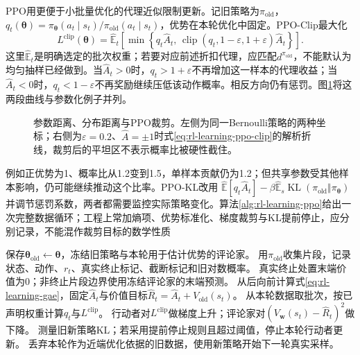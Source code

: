 PPO用更便于小批量优化的代理近似限制更新。记旧策略为$\pi_{\mathrm{old}}$，
$q_t(\bm\theta)=\pi_{\bm\theta}(a_t\mid s_t)/
\pi_{\mathrm{old}}(a_t\mid s_t)$，优势在本轮优化中固定。PPO-Clip最大化
\begin{equation}
  L^{\mathrm{clip}}(\bm\theta)=
    \widehat{\mathbb E}_t
      \left[\min\left\{q_t\widehat A_t,\,
        \operatorname{clip}(q_t,1-\varepsilon,1+\varepsilon)
                      \widehat A_t\right\}\right].
  \label{eq:rl-learning-ppo-clip}
\end{equation}
这里$\widehat{\mathbb E}_t$是明确选定的批次权重；若要对应前述折扣代理，应匹配$d^{\pi_{\mathrm{old}}}$，不能默认为均匀抽样已经做到。当$\widehat A_t>0$时，$q_t>1+\varepsilon$不再增加这一样本的代理收益；当$\widehat A_t<0$时，$q_t<1-\varepsilon$不再奖励继续压低该动作概率。相反方向仍有惩罚。图\ref{fig:rl-learning-policy-geometry}将这两段曲线与参数化例子并列。

\begin{figure}[t]
  \centering
  
  \caption{参数距离、分布距离与PPO裁剪。左侧为同一Bernoulli策略的两种坐标；右侧为$\varepsilon=0.2$、$\widehat A=\pm1$时式\eqref{eq:rl-learning-ppo-clip}的解析折线，裁剪后的平坦区不表示概率比被硬性截住。}
  \label{fig:rl-learning-policy-geometry}
\end{figure}

例如正优势为1、概率比从1.2变到1.5，单样本贡献仍为1.2；但共享参数受其他样本影响，仍可能继续推动这个比率。PPO-KL改用
$\widehat{\mathbb E}[q_t\widehat A_t]
-\beta\widehat{\mathbb E}_s\operatorname{KL}
(\pi_{\mathrm{old}}\Vert\pi_{\bm\theta})$
并调节惩罚系数，两者都需要监控实际策略变化。算法\ref{alg:rl-learning-ppo}给出一次完整数据循环；工程上常加熵项、优势标准化、梯度裁剪与KL提前停止，应分别记录，不能混作裁剪目标的数学性质

\begin{algorithm}
  \label{alg:rl-learning-ppo}
  \begin{algorithmic}[1]
    \State 保存$\bm\theta_{\mathrm{old}}\gets\bm\theta$，冻结旧策略与本轮用于估计优势的评论家。
    \State 用$\pi_{\mathrm{old}}$收集片段，记录状态、动作、$r_t$、真实终止标记、截断标记和旧对数概率。
    \State 真实终止处置末端价值为0；非终止片段边界使用冻结评论家的末端预测。
    \State 从后向前计算式\eqref{eq:rl-learning-gae}，固定$\widehat A_t$与价值目标$\widehat R_t=\widehat A_t+V_{\mathrm{old}}(s_t)$。
      \State 从本轮数据取批次，按已声明权重计算$q_t$与$L^{\mathrm{clip}}$。
      \State 行动者对$L^{\mathrm{clip}}$做梯度上升；评论家对$(V_{\bm w}(s_t)-\widehat R_t)^2$做下降。
      \State 测量旧新策略KL；若采用提前停止规则且超过阈值，停止本轮行动者更新。
    \EndFor
    \State 丢弃本轮作为近端优化依据的旧数据，使用新策略开始下一轮真实采样。
  \end{algorithmic}
\end{algorithm}

